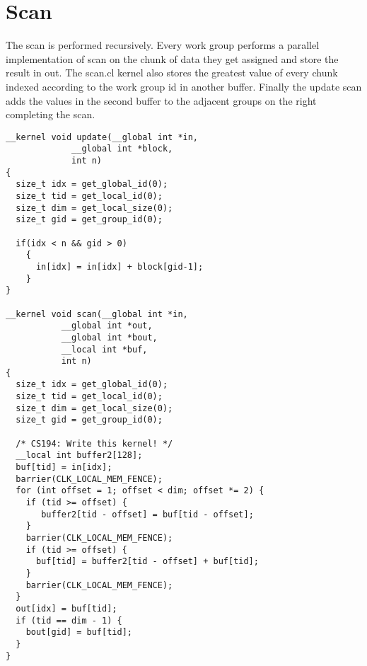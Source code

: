 \documentclass[11pt,letter]{article}
\begin{document}
\section{Scan}
The scan is performed recursively. Every work group performs a parallel implementation of scan on the chunk of data they get assigned and store the result in out. The scan.cl kernel also stores the greatest value of every chunk indexed according to the work group id in another buffer. Finally the update scan adds the values in the second buffer to the adjacent groups on the right completing the scan. 
\begin{lstlisting}[label=some-code,caption=scan.cl]
__kernel void update(__global int *in,
		     __global int *block,
		     int n)
{
  size_t idx = get_global_id(0);
  size_t tid = get_local_id(0);
  size_t dim = get_local_size(0);
  size_t gid = get_group_id(0);

  if(idx < n && gid > 0)
    {
      in[idx] = in[idx] + block[gid-1];
    }
}

__kernel void scan(__global int *in,
		   __global int *out,
		   __global int *bout,
		   __local int *buf,
		   int n)
{
  size_t idx = get_global_id(0);
  size_t tid = get_local_id(0);
  size_t dim = get_local_size(0);
  size_t gid = get_group_id(0);

  /* CS194: Write this kernel! */
  __local int buffer2[128];
  buf[tid] = in[idx];
  barrier(CLK_LOCAL_MEM_FENCE);
  for (int offset = 1; offset < dim; offset *= 2) {
    if (tid >= offset) {
       buffer2[tid - offset] = buf[tid - offset];
    }
    barrier(CLK_LOCAL_MEM_FENCE);
    if (tid >= offset) {
      buf[tid] = buffer2[tid - offset] + buf[tid];
    }
    barrier(CLK_LOCAL_MEM_FENCE);
  }
  out[idx] = buf[tid];
  if (tid == dim - 1) {
    bout[gid] = buf[tid];
  }
}
\end{lstlisting}

\end{document}
